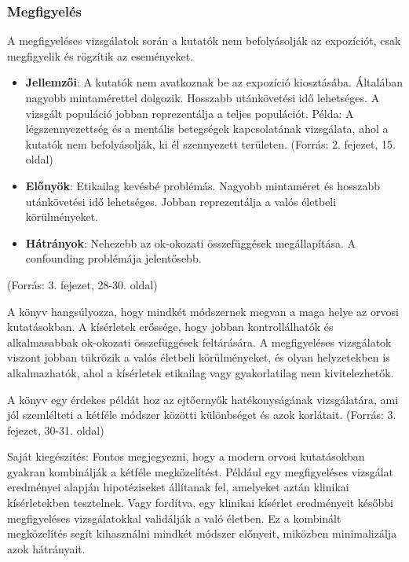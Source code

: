 \documentclass[a4paper,12pt]{article}
\begin{document}
\subsubsection{Megfigyelés}

A megfigyeléses vizsgálatok során a kutatók nem befolyásolják az expozíciót, csak megfigyelik és rögzítik az eseményeket.

\begin{itemize}

\item \textbf{Jellemzői}: A kutatók nem avatkoznak be az expozíció kiosztásába.
Általában nagyobb mintamérettel dolgozik.
Hosszabb utánkövetési idő lehetséges.
A vizsgált populáció jobban reprezentálja a teljes populációt.
Példa: A légszennyezettség és a mentális betegségek kapcsolatának vizsgálata, ahol a kutatók nem befolyásolják, ki él szennyezett területen. (Forrás: 2. fejezet, 15. oldal)

\item  \textbf{Előnyök}: Etikailag kevésbé problémás.
Nagyobb mintaméret és hosszabb utánkövetési idő lehetséges.
Jobban reprezentálja a valós életbeli körülményeket.

\item \textbf{Hátrányok}: Nehezebb az ok-okozati összefüggések megállapítása.
A confounding problémája jelentősebb.
\end{itemize}


(Forrás: 3. fejezet, 28-30. oldal)

A könyv hangsúlyozza, hogy mindkét módszernek megvan a maga helye az orvosi kutatásokban. A kísérletek erőssége, hogy jobban kontrollálhatók és alkalmasabbak ok-okozati összefüggések feltárására. A megfigyeléses vizsgálatok viszont jobban tükrözik a valós életbeli körülményeket, és olyan helyzetekben is alkalmazhatók, ahol a kísérletek etikailag vagy gyakorlatilag nem kivitelezhetők.

A könyv egy érdekes példát hoz az ejtőernyők hatékonyságának vizsgálatára, ami jól szemlélteti a kétféle módszer közötti különbséget és azok korlátait. (Forrás: 3. fejezet, 30-31. oldal)

Saját kiegészítés: Fontos megjegyezni, hogy a modern orvosi kutatásokban gyakran kombinálják a kétféle megközelítést. Például egy megfigyeléses vizsgálat eredményei alapján hipotéziseket állítanak fel, amelyeket aztán klinikai kísérletekben tesztelnek. Vagy fordítva, egy klinikai kísérlet eredményeit későbbi megfigyeléses vizsgálatokkal validálják a való életben. Ez a kombinált megközelítés segít kihasználni mindkét módszer előnyeit, miközben minimalizálja azok hátrányait.
\end{document}
